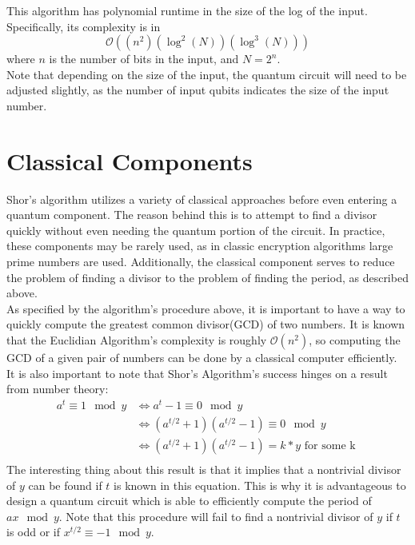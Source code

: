\documentclass{exam} %
\theoremstyle{plain}
\theoremstyle{definition}
\theoremstyle{remark}
\numberwithin{equation}{section}  %
\renewcommand{\O}{\mathcal{O}}
\begin{document}
This algorithm has polynomial runtime in the size of the log of the input. Specifically, its complexity is in 
\[
  \O((n^2)(\log^2(N))(\log^3(N)))
\]
where $n$ is the number of bits in the input, and $N = 2^n$.\\

Note that depending on the size of the input, the quantum circuit will need
to be adjusted slightly, as the number of input qubits indicates the size of
the input number.\\
\section{Classical Components}

Shor's algorithm utilizes a variety of classical approaches before even entering
a quantum component. The reason behind this is to attempt to find a divisor quickly without even needing the quantum portion of the circuit. In practice, 
these components may be rarely used, as in classic encryption algorithms large 
prime numbers are used. Additionally, the classical component serves to reduce
the problem of finding a divisor to the problem of finding the period, as 
described above.\\

As specified by the algorithm's procedure above, it is important to have a 
way to quickly compute the greatest common divisor(GCD) of two numbers. It is 
known that the Euclidian Algorithm's complexity is roughly  $\O(n^2)$, so
computing the GCD of a given pair of numbers can be done by a classical computer
efficiently.\\

It is also important to note that Shor's Algorithm's success hinges on a result
from number theory:
\begin{align*}
  a^t \equiv 1 \mod y
  &\Leftrightarrow a^t -1 \equiv 0 \mod y\\ 
  &\Leftrightarrow (a^{t/2} + 1)(a^{t/2} - 1) \equiv 0 \mod y\\ 
  &\Leftrightarrow  (a^{t/2}+1)(a^{t/2}-1) = k * y \text{ for some k }\\
\end{align*}
The interesting thing about this result is that it implies that a nontrivial 
divisor of $y$ can be found if $t$ is known in this equation. This is why it
is advantageous to design a quantum circuit which is able to efficiently compute
the period of $ax\mod y$. Note that this procedure will fail to find a 
nontrivial divisor of $y$ if $t$ is odd or if $x^{t/2} \equiv -1 \mod y$.\\
\end{document}
